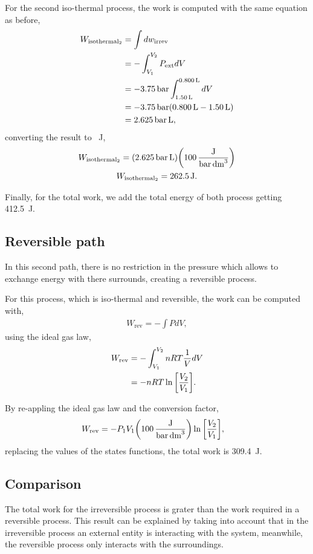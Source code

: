 \documentclass[main.tex]{subfiles}
\begin{document}
For the second iso-thermal process, the work is computed with the same equation as before,
\begin{align*}
    W_{\mathrm{isothermal}_2} &= \int dw_{\mathrm{irrev}} \\
     &= -\int_{V_{1}}^{V_{2}} P_{\mathrm{ext}}dV \\
    &= -\SI{3.75}{\bar}\int_{\SI{1.50}{\liter}}^{\SI{0.800}{\liter}}dV \\
    &= -\SI{3.75}{\bar}\qty(\SI{0.800}{\liter}-\SI{1.50}{\liter}) \\
    &= \SI{2.625}{\bar\liter},
\end{align*}
converting the result to \SI{}{\joule},
\begin{gather*}
    W_{\mathrm{isothermal}_2} = \qty(\SI{2.625}{\bar\liter})\qty(\SI[per-mode=fraction]{100}{\joule\per\bar\per\deci\meter\tothe{3}}) \\
    W_{\mathrm{isothermal}_2} = \SI{262.5}{\joule}.
\end{gather*}

Finally, for the total work, we add the total energy of both process getting \SI{412.5}{\joule}.

\subsection{Reversible path}

In this second path, there is no restriction in the pressure which allows to exchange energy with there surrounds, creating a reversible process.

For this process, which is iso-thermal and reversible, the work can be computed with,
\begin{gather*}
    W_{\mathrm{rev}} = -\int P dV,
\end{gather*}
using the ideal gas law,
\begin{align*}
    W_{\mathrm{rev}} &= -\int_{V_{1}}^{V_{2}} nRT\frac{1}{V}dV \\
    &= -nRT\ln\qty[\frac{V_{2}}{V_{1}}].
\end{align*}

By re-appling the ideal gas law and the conversion factor,
\begin{align*}
    W_{\mathrm{rev}} &= -P_{1}V_{1}\qty(\SI[per-mode=fraction]{100}{\joule\per\bar\per\deci\meter\tothe{3}})\ln\qty[\frac{V_{2}}{V_{1}}],
\end{align*}
replacing the values of the states functions, the total work is \SI{309.4}{\joule}.

\subsection{Comparison}

The total work for the irreversible process is grater than the work required in a reversible process.
This result can be explained by taking into account that in the irreversible process an external entity is interacting with the system, meanwhile, the reversible process only interacts with the surroundings.

\end{document}
